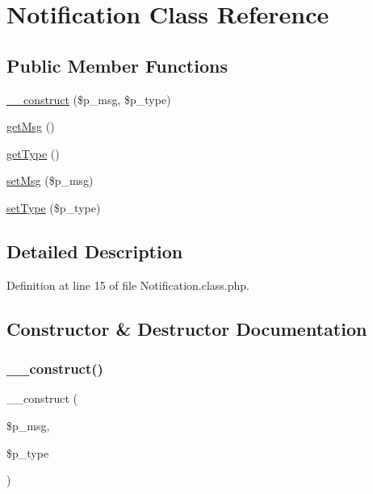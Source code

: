 \hypertarget{class_notification}{}\section{Notification Class Reference}
\label{class_notification}
\subsection*{Public Member Functions}
\begin{DoxyCompactItemize}
\item 
\hyperlink{class_notification_a90867f18c4244bb2184d664dc0981c66}{\+\_\+\+\_\+construct} (\$p\+\_\+msg, \$p\+\_\+type)
\item 
\hyperlink{class_notification_a177bc4ecf4167a98368da00df884413b}{get\+Msg} ()
\item 
\hyperlink{class_notification_a830b5c75df72b32396701bc563fbe3c7}{get\+Type} ()
\item 
\hyperlink{class_notification_afee42eec7fc90f1111f0bc31ad1bfe11}{set\+Msg} (\$p\+\_\+msg)
\item 
\hyperlink{class_notification_a52b993e081ed8c1fe0f5ef64d8683c80}{set\+Type} (\$p\+\_\+type)
\end{DoxyCompactItemize}


\subsection{Detailed Description}


Definition at line 15 of file Notification.\+class.\+php.



\subsection{Constructor \& Destructor Documentation}
\mbox{\label{class_notification_a90867f18c4244bb2184d664dc0981c66}} 
\subsubsection{\texorpdfstring{\+\_\+\+\_\+construct()}{\_\_construct()}}
{\footnotesize\ttfamily \+\_\+\+\_\+construct (\begin{DoxyParamCaption}\item[{}]{\$p\+\_\+msg,  }\item[{}]{\$p\+\_\+type }\end{DoxyParamCaption})}



